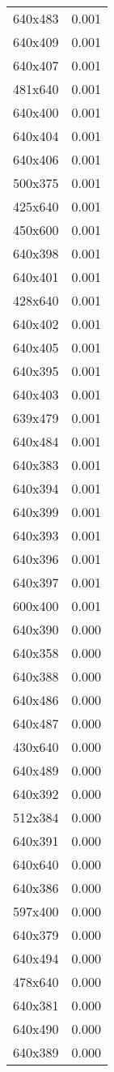 \begin{table}
\begin{tabular}{lr}
640x483 & 0.001 \\
640x409 & 0.001 \\
640x407 & 0.001 \\
481x640 & 0.001 \\
640x400 & 0.001 \\
640x404 & 0.001 \\
640x406 & 0.001 \\
500x375 & 0.001 \\
425x640 & 0.001 \\
450x600 & 0.001 \\
640x398 & 0.001 \\
640x401 & 0.001 \\
428x640 & 0.001 \\
640x402 & 0.001 \\
640x405 & 0.001 \\
640x395 & 0.001 \\
640x403 & 0.001 \\
639x479 & 0.001 \\
640x484 & 0.001 \\
640x383 & 0.001 \\
640x394 & 0.001 \\
640x399 & 0.001 \\
640x393 & 0.001 \\
640x396 & 0.001 \\
640x397 & 0.001 \\
600x400 & 0.001 \\
640x390 & 0.000 \\
640x358 & 0.000 \\
640x388 & 0.000 \\
640x486 & 0.000 \\
640x487 & 0.000 \\
430x640 & 0.000 \\
640x489 & 0.000 \\
640x392 & 0.000 \\
512x384 & 0.000 \\
640x391 & 0.000 \\
640x640 & 0.000 \\
640x386 & 0.000 \\
597x400 & 0.000 \\
640x379 & 0.000 \\
640x494 & 0.000 \\
478x640 & 0.000 \\
640x381 & 0.000 \\
640x490 & 0.000 \\
640x389 & 0.000 \\

\end{tabular}
\end{table}
